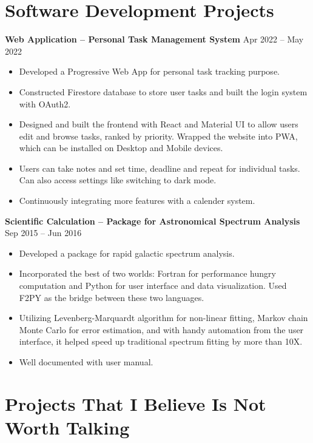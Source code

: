 \documentclass[letterpaper,12pt]{article}
\newenvironment{zitemize}{
\begin{itemize} \vspace{-.9em}\itemsep 0pt \parskip 0pt}
{\end{itemize}\vspace{-.5em}}
\begin{document}
\section{Software Development Projects}

\textbf{Web Application -- Personal Task Management System} \hfill Apr 2022 -- May 2022 \\
\begin{zitemize}
    \item Developed a Progressive Web App for personal task tracking purpose.
    \item Constructed Firestore database to store user tasks and built the login system with OAuth2.
    \item Designed and built the frontend with React and Material UI to allow users edit and browse tasks, ranked by priority. Wrapped the website into PWA, which can be installed on Desktop and Mobile devices.
    \item Users can take notes and set time, deadline and repeat for individual tasks. Can also access settings like switching to dark mode.
    \item Continuously integrating more features with a calender system.
\end{zitemize}

\textbf{Scientific Calculation -- Package for Astronomical Spectrum Analysis} \hfill Sep 2015 -- Jun 2016 \\
\begin{zitemize}
    \item Developed a package for rapid galactic spectrum analysis.
    \item Incorporated the best of two worlds: Fortran for performance hungry computation and Python for user interface and data visualization. Used F2PY as the bridge between these two languages.
    \item Utilizing Levenberg-Marquardt algorithm for non-linear fitting, Markov chain Monte Carlo for error estimation, and with handy automation from the user interface, it helped speed up traditional spectrum fitting by more than 10X. 
    \item Well documented with user manual.
\end{zitemize}



\section{Projects That I Believe Is Not Worth Talking}
\end{document}
